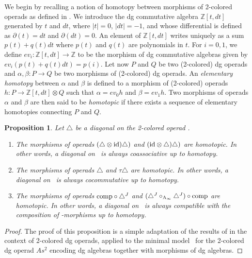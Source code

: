 \documentclass[twoside, 11pt]{amsart}
\newtheorem{proposition}[definition]{Proposition}
\theoremstyle{remark}
\begin{document}
We begin by recalling a notion of homotopy between morphisms of 2-colored operads as defined in \cite[Section 3.10]{MSS}. We introduce the dg commutative algebra $\mathbb{Z}[t,dt]$ generated by $t$ and $dt$, where $|t|=0$, $|dt|=-1$, and whose differential is defined as $\partial (t) = dt$ and $\partial (dt) = 0$. An element of $\mathbb{Z}[t,dt]$ writes uniquely as a sum $p(t)+q(t)dt$ where $p(t)$ and $q(t)$ are polynomials in $t$. For $i=0,1$, we define $ev_i : \mathbb{Z}[t,dt] \rightarrow \mathbb{Z}$ to be the morphism of dg commutative algebras given by $ev_i ( p(t) + q(t)dt ) = p(i)$.
Let now $P$ and $Q$ be two (2-colored) dg operads and $\alpha , \beta : P \rightarrow Q$ be two morphisms of (2-colored) dg operads.
An \textit{elementary homotopy} between $\alpha$ and $\beta$ is defined to a morphism of (2-colored) operads $h : P \rightarrow \mathbb{Z}[t,dt] \otimes Q$ such that $\alpha = ev_0 h$ and $\beta = ev_1 h$.
Two morphisms of operads $\alpha$ and $\beta$ are then said to be \textit{homotopic} if there exists a sequence of elementary homotopies connecting $P$ and $Q$.

\begin{proposition} \label{th:homotopy-properties}
Let $\triangle$ be a diagonal on the 2-colored operad \Ainfdeux . 
\begin{enumerate}
    \item The morphisms of operads $(\triangle \otimes \mathrm{id} ) \triangle)$ and $(\mathrm{id} \otimes \triangle) \triangle)$ are homotopic. In other words, a diagonal on \Ainfdeux\ is always coassociative up to homotopy.
    \item The morphisms of operads $\triangle$ and $\tau \triangle$ are homotopic. In other words, a diagonal on \Ainfdeux\ is always cocommutative up to homotopy.
    \item The morphisms of operads $\mathrm{comp}  \circ \triangle^{J}$ and $( \triangle^{J} \circ_{\mathrm{A}_\infty} \triangle^{J} ) \circ \mathrm{comp}$ are homotopic. In other words, a diagonal on \Ainfdeux\ is always compatible with the composition of \Ainf -morphisms up to homotopy.
\end{enumerate}
\end{proposition}

\begin{proof}
The proof of this proposition is a simple adaptation of the results of \cite[Section 2]{MarklShnider06} in the context of 2-colored dg operads, applied to the minimal model \Ainfdeux\ for the 2-colored dg operad $As^2$ encoding dg algebras together with morphisms of dg algebras.
\end{proof}
\end{document}
